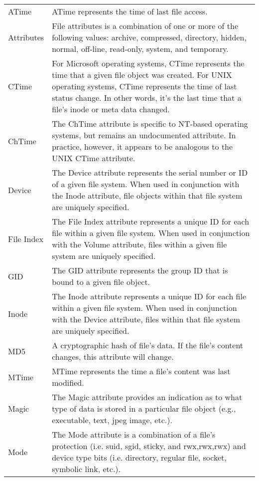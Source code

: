 \documentclass[10pt]{article}
\begin{document}
\begin{center}
\begin{supertabular}{lp{4.75in}}
ATime
&
ATime represents the time of last file access.
\\[.5em]
Attributes
&
File attributes is a combination of one or more of the following
values: archive, compressed, directory, hidden, normal, off-line,
read-only, system, and temporary.
\\[.5em]
CTime
&
For Microsoft operating systems, CTime represents the time that a
given file object was created.  For UNIX operating systems, CTime
represents the time of last status change.  In other words, it's
the last time that a file's inode or meta data changed.
\\[.5em]
ChTime
&
The ChTime attribute is specific to NT-based operating systems,
but remains an undocumented attribute.  In practice, however, it
appears to be analogous to the UNIX CTime attribute.
\\[.5em]
Device
&
The Device attribute represents the serial number or ID of a given
file system.  When used in conjunction with the Inode attribute,
file objects within that file system are uniquely specified.
\\[.5em]
File Index
&
The File Index attribute represents a unique ID for each file within
a given file system.  When used in conjunction with the Volume
attribute, files within a given file system are uniquely specified.
\\[.5em]
GID
&
The GID attribute represents the group ID that is bound to a given
file object.
\\[.5em]
Inode
&
The Inode attribute represents a unique ID for each file within a
given file system.  When used in conjunction with the Device
attribute, files within that file system are uniquely specified.
\\[.5em]
MD5
&
A cryptographic hash of file's data.  If the file's content
changes, this attribute will change.
\\[.5em]
MTime
&
MTime represents the time a file's content was last modified.
\\[.5em]
Magic
&
The Magic attribute provides an indication as to what type of data
is stored in a particular file object (e.g., executable, text, jpeg
image, etc.).
\\[.5em]
Mode
&
The Mode attribute is a combination of a file's protection (i.e.
suid, sgid, sticky, and rwx,rwx,rwx) and device type bits (i.e.
directory, regular file, socket, symbolic link, etc.).
\\[.5em]

\end{supertabular}
\end{center}
\end{document}
